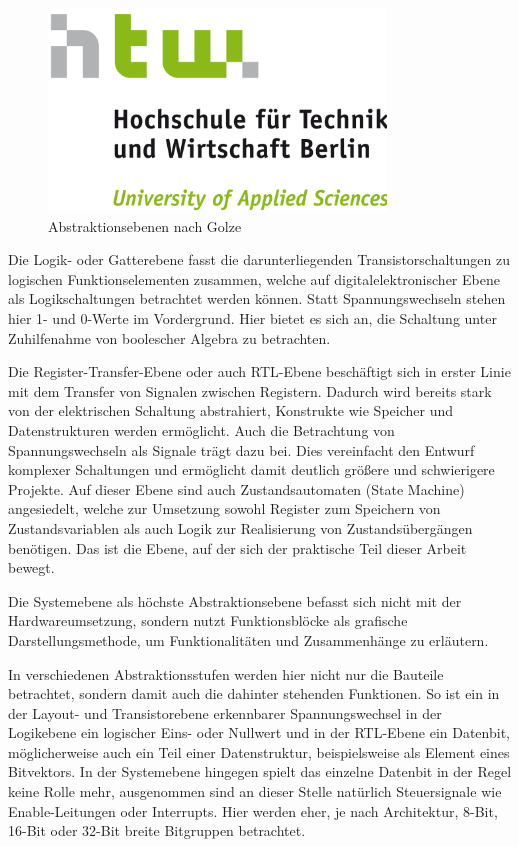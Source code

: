 \documentclass[11pt,a4paper,titlepage]{article}
\begin{document}
\begin{figure}[!ht]
	\centering
	\includegraphics[width=0.8\textwidth]{images/htw_hochschule.png}
	\caption{Abstraktionsebenen nach Golze \cite{Golze}}
	\label{img:AbstrEbenen}
\end{figure}

Die Logik- oder Gatterebene fasst die darunterliegenden Transistorschaltungen zu logischen Funktionselementen zusammen, welche auf digitalelektronischer Ebene als Logikschaltungen betrachtet werden können. Statt Spannungswechseln stehen hier 1- und 0-Werte im Vordergrund. Hier bietet es sich an, die Schaltung unter Zuhilfenahme von boolescher Algebra zu betrachten.

Die Register-Transfer-Ebene oder auch RTL-Ebene beschäftigt sich in erster Linie mit dem Transfer von Signalen zwischen Registern. Dadurch wird bereits stark von der elektrischen Schaltung abstrahiert, Konstrukte wie Speicher und Datenstrukturen werden ermöglicht. Auch die Betrachtung von Spannungswechseln als Signale trägt dazu bei. Dies vereinfacht den Entwurf komplexer Schaltungen und ermöglicht damit deutlich größere und schwierigere Projekte. Auf dieser Ebene sind auch Zustandsautomaten (State Machine) angesiedelt, welche zur Umsetzung sowohl Register zum Speichern von Zustandsvariablen als auch Logik zur Realisierung von Zustandsübergängen benötigen.
Das ist die Ebene, auf der sich der praktische Teil dieser Arbeit bewegt.

Die Systemebene als höchste Abstraktionsebene befasst sich nicht mit der Hardwareumsetzung, sondern nutzt Funktionsblöcke als grafische Darstellungsmethode, um Funktionalitäten und Zusammenhänge zu erläutern. 

In verschiedenen Abstraktionsstufen werden hier nicht nur die Bauteile betrachtet, sondern damit auch die dahinter stehenden Funktionen. So ist ein in der Layout- und Transistorebene erkennbarer Spannungswechsel in der Logikebene ein logischer Eins- oder Nullwert und in der RTL-Ebene ein Datenbit, möglicherweise auch ein Teil einer Datenstruktur, beispielsweise als Element eines Bitvektors. In der Systemebene hingegen spielt das einzelne Datenbit in der Regel keine Rolle mehr, ausgenommen sind an dieser Stelle natürlich Steuersignale wie Enable-Leitungen oder Interrupts. Hier werden eher, je nach Architektur, 8-Bit, 16-Bit oder 32-Bit breite Bitgruppen betrachtet.
\end{document}
